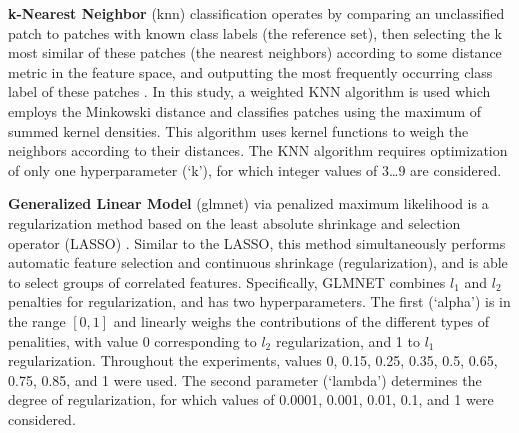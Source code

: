 {\bf k-Nearest Neighbor} (\gls{knn}) classification operates by comparing an unclassified patch to patches with known class labels (the reference set), then selecting the k most similar of these patches (the nearest neighbors) according to some distance metric in the feature space, and outputting the most frequently occurring class label of these patches \cite{cover1967nearest}. In this study, a weighted KNN algorithm is used \cite{hechenbichler2004weighted, samworth2012optimal} which employs the Minkowski distance and classifies patches using the maximum of summed kernel densities. This algorithm uses kernel functions to weigh the neighbors according to their distances. The KNN algorithm requires optimization of only one hyperparameter (`k'), for which integer values of 3\dots9 are considered.

{\bf Generalized Linear Model} (\gls{glmnet}) via penalized maximum likelihood \cite{friedman2010regularization} is a regularization method based on the least absolute shrinkage and selection operator (LASSO) \cite{tibshirani1996regression}. Similar to the LASSO, this method simultaneously performs automatic feature selection and continuous shrinkage (regularization), and is able to select groups of correlated features. Specifically, GLMNET combines $l_1$ and $l_2$ penalties for regularization, and has two hyperparameters. The first (`alpha') is in the range $[0,1]$ and linearly weighs the contributions of the different types of penalities, with value 0 corresponding to $l_2$ regularization, and 1 to $l_1$ regularization. Throughout the experiments, values 0, 0.15, 0.25, 0.35, 0.5, 0.65, 0.75, 0.85, and 1 were used. The second parameter (`lambda') determines the degree of regularization, for which values of 0.0001, 0.001, 0.01, 0.1, and 1 were considered.

